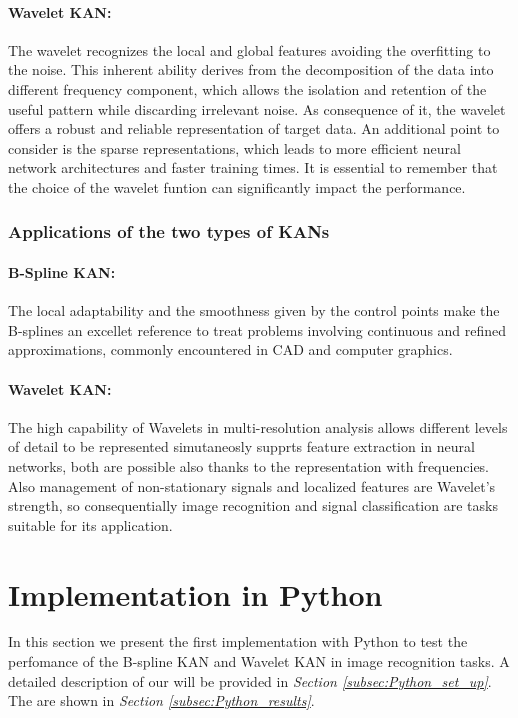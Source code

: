 \documentclass[11pt,a4paper,twocolumn]{article}
\begin{document}
    \paragraph{Wavelet KAN:}The wavelet recognizes the local and global features avoiding the overfitting to the noise.
                            This inherent ability derives from the decomposition of the data into different frequency component,
                            which allows the isolation and retention of the useful pattern while discarding irrelevant noise.
                            As consequence of it, the wavelet offers a robust and reliable representation of target data.
                            An additional point to consider is the sparse representations, which leads to more efficient neural network architectures and faster training times.
                            It is essential to remember that the choice of the wavelet funtion can significantly impact the performance.

    \subsubsection{Applications of the two types of KANs}
    \label{subsubsec:applications}
    \paragraph{B-Spline KAN:} The local adaptability and the smoothness given by the control points make the B-splines an excellet reference to 
    treat problems involving continuous and refined approximations, commonly encountered in CAD and computer graphics.
    \paragraph{Wavelet KAN:} The high capability of Wavelets in multi-resolution analysis allows different levels of detail to be represented simutaneosly
    supprts feature extraction in neural networks, both are possible also thanks to the representation with frequencies. Also management of 
    non-stationary signals and localized features are Wavelet's strength, so consequentially image recognition and signal classification
    are tasks suitable for its application.


\section{Implementation in Python}
\label{sec:python}
In this section we present the first implementation with Python to test the perfomance of the B-spline KAN and 
Wavelet KAN in image recognition tasks.
A detailed description of our \textit{} will be provided in \textit{Section \ref{subsec:Python_set_up}}.
The \textit{} are shown in \textit{Section \ref{subsec:Python_results}}. 
\end{document}
